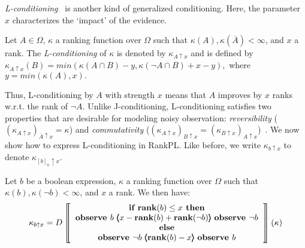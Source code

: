\documentclass{llncs}
\newcommand{\mods}[2]{[#2]_{#1}}
\newcommand{\Rank}[1]{\hspace{3pt} \pmb{\langle} #1 \pmb{\rangle}\hspace{3pt} } %
\newcommand{\States}{\Omega}
\begin{document}
\emph{L-conditioning}~\cite{goldszmidt1996qualitative} %
is another kind of generalized conditioning.
Here, the parameter $x$ characterizes the `impact' of the evidence. %
\begin{definition}\label{defn:evidenceoriented}
Let $A \in \Omega$, $\kappa$ a ranking function over $\Omega$ such that $\kappa(A), \kappa(\overline A) < \infty$, and $x$ a rank.
The \emph{L-conditioning} of $\kappa$ is denoted by $\kappa_{A \uparrow x}$ and is defined by
	$\kappa_{A \uparrow x}(B) = min ( \kappa(A \cap B) - y, \kappa(\neg A \cap B) + x - y ),$ %
where $y = min(\kappa(A), x).$
\end{definition}
Thus, L-conditioning by $A$ with strength $x$ means that $A$ improves by $x$ ranks w.r.t. the rank of $\neg A$.
Unlike J-conditioning, L-conditioning satisfies two properties 
that are desirable for modeling noisy observation:
	\textit{reversibility} ($(\kappa_{A \uparrow x})_{\overline{A} \uparrow x} = \kappa$) and 
	\textit{commutativity} ($(\kappa_{A \uparrow x})_{B \uparrow x} = (\kappa_{B \uparrow x})_{A \uparrow x}$)~\cite{DBLP:books/daglib/0035277}.
We now show how to express L-conditioning in RankPL.
Like before, we write $\kappa_{b \uparrow x}$ to denote $\kappa_{\mods{\kappa}{b} \uparrow x}$.
\begin{theorem}\label{thm:evidenceoriented}
Let $b$ be a boolean expression, $\kappa$ a ranking function over $\States$ such that $\kappa(b), \kappa(\neg b) < \infty$, and $x$ a rank.
We then have:
	$$\kappa_{b \uparrow x} = D
	\left\llbracket\begin{tabular}{c} 
	\mbox{$\textbf{if rank}(b) \leq x\textbf{ then}$} \\
	\mbox{$\textbf{observe }b \Rank{x - \textbf{rank}(b) + \textbf{rank}(\neg b)} \textbf{observe }\neg b$} \\
	\mbox{$\textbf{else}$} \\
	\mbox{$\textbf{observe }\neg b \Rank{\textbf{rank}(b) - x} \textbf{observe }b$} \\
	\end{tabular}\right\rrbracket(\kappa)$$
\end{theorem}
\end{document}
